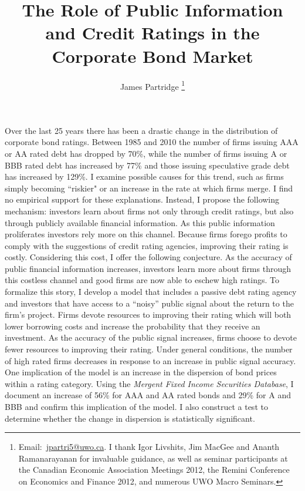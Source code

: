 \documentclass[notitlepage]{article}
\title{The Role of Public Information and Credit Ratings in the Corporate Bond Market}
\author{James Partridge%
\thanks{Email:~\href{mailto:jpartri5@uwo.ca}{jpartri5@uwo.ca}. I thank Igor Livshits, Jim MacGee and Ananth Ramanarayanan for invaluable guidance, as well as seminar participants at the Canadian Economic Association Meetings 2012, the Remini Conference on Economics and Finance 2012, and numerous UWO Macro Seminars.}}
\affil{The University of Western Ontario}
\date{}
\begin{document}
\maketitle
\vspace{-25pt}
\begin{onecolabstract}
Over the last 25 years there has been a drastic change in the distribution of corporate bond ratings. Between 1985 and 2010 the number of firms issuing AAA or AA rated debt has dropped by 70\%, while the number of firms issuing A or BBB rated debt has increased by 77\% and those issuing speculative grade debt has increased by 129\%. I examine possible causes for this trend, such as firms simply becoming ``riskier" or an increase in the rate at which firms merge. I find no empirical support for these explanations. Instead, I propose the following mechanism: investors learn about firms not only through credit ratings, but also through publicly available financial information. As this public information proliferates investors rely more on this channel. Because firms forego profits to comply with the suggestions of credit rating agencies, improving their rating is costly. Considering this cost, I offer the following conjecture. As the accuracy of public financial information increases, investors learn more about firms through this costless channel and good firms are now able to eschew high ratings. To formalize this story, I develop a model that includes a passive debt rating agency and investors that have access to a ``noisy'' public signal about the return to the firm's project. Firms devote resources to improving their rating which will both lower borrowing costs and increase the probability that they receive an investment.  As the accuracy of the public signal increases, firms choose to devote fewer resources to improving their rating. Under general conditions, the number of high rated firms decreases in response to an increase in public signal accuracy. One implication of the model is an increase in the dispersion of bond prices within a rating category. Using the \textit{Mergent Fixed Income Securities Database}, I document an increase of 56\% for AAA and AA rated bonds and 29\% for A and BBB and confirm this implication of the model. I also construct a test to determine whether the change in dispersion is statistically significant.
\end{onecolabstract}

\clearpage
\end{document}
